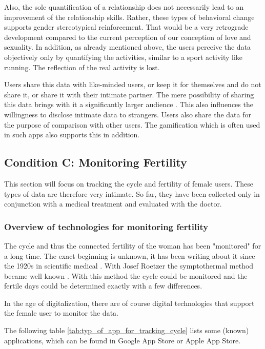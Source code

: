 Also, the sole quantification of a relationship does not necessarily lead to an improvement of the relationship skills. Rather, these types of behavioral change supports gender stereotypical reinforcement. That would be a very retrograde development compared to the current perception of our conception of love and sexuality. %
In addition, as already mentioned above, the users perceive the data objectively only by quantifying the activities, similar to a sport activity like running. The reflection of the real activity is lost.

Users share this data with like-minded users, or keep it for themselves and do not share it, or share it with their intimate partner.
The mere possibility of sharing this data brings with it a significantly larger audience \cite{doi:10.1080/13691058.2014.920528}. This also influences the willingness to disclose intimate data to strangers.
Users also share the data for the purpose of comparison with other users. The gamification which is often used in such apps also supports this in addition.

\subsection{Condition C: Monitoring Fertility}
\label{subsec:c}
This section will focus on tracking the cycle and fertility of female users. These types of data are therefore very intimate. So far, they have been collected only in conjunction with a medical treatment and evaluated with the doctor.
\subsubsection{Overview of technologies for monitoring fertility}
The cycle and thus the connected fertility of the woman has been "monitored" for a long time. The exact beginning is unknown, it has been writing about it since the 1920s in scientific medical \cite{rotzer1988geschichte}. %
With Josef Roetzer the symptothermal method became well known \cite{roetzer1968erweiterte}. With this method the cycle could be monitored and the fertile days could be determined exactly with a few differences.

In the age of digitalization, there are of course digital technologies that support the female user to monitor the data.

The following table \ref{tab:typ_of_app_for_tracking_cycle} lists some (known) applications, which can be found in Google App Store or Apple App Store.

